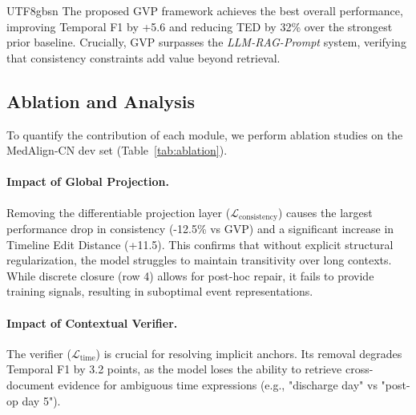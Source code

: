 \documentclass[11pt]{article}
\begin{document}
\begin{CJK*}{UTF8}{gbsn}
The proposed GVP framework achieves the best overall performance, improving Temporal F1 by +5.6 and reducing TED by 32\% over the strongest prior baseline. Crucially, GVP surpasses the \emph{LLM-RAG-Prompt} system, verifying that consistency constraints add value beyond retrieval.

\subsection{Ablation and Analysis}
To quantify the contribution of each module, we perform ablation studies on the MedAlign-CN dev set (Table~\ref{tab:ablation}).

\begin{table}[t]
\centering
{}
\caption{Ablation on the MedAlign-CN dev set.}
\label{tab:ablation}
\end{table}

\paragraph{Impact of Global Projection.}
Removing the differentiable projection layer ($\mathcal{L}_{\text{consistency}}$) causes the largest performance drop in consistency (-12.5\% vs GVP) and a significant increase in Timeline Edit Distance (+11.5). This confirms that without explicit structural regularization, the model struggles to maintain transitivity over long contexts. While discrete closure (row 4) allows for post-hoc repair, it fails to provide training signals, resulting in suboptimal event representations.

\paragraph{Impact of Contextual Verifier.}
The verifier ($\mathcal{L}_{\text{time}}$) is crucial for resolving implicit anchors. Its removal degrades Temporal F1 by 3.2 points, as the model loses the ability to retrieve cross-document evidence for ambiguous time expressions (e.g., "discharge day" vs "post-op day 5").


\end{CJK*}
\end{document}
